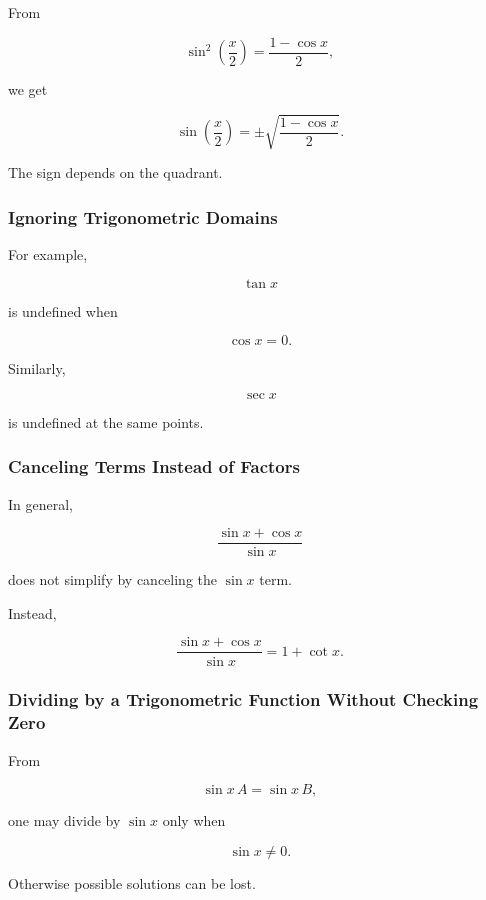 From

\[
\sin^2
\left(
\frac{x}{2}
\right)
=
\frac{1-\cos x}{2},
\]

we get

\[
\boxed{
\sin
\left(
\frac{x}{2}
\right)
=
\pm
\sqrt{
\frac{1-\cos x}{2}
}.
}
\]

The sign depends on the quadrant.

\subsubsection{Ignoring Trigonometric Domains}

For example,

\[
\tan x
\]

is undefined when

\[
\boxed{
\cos x=0.
}
\]

Similarly,

\[
\sec x
\]

is undefined at the same points.

\subsubsection{Canceling Terms Instead of Factors}

In general,

\[
\frac{
\sin x+\cos x
}{
\sin x
}
\]

does not simplify by canceling the \(\sin x\) term.

Instead,

\[
\boxed{
\frac{
\sin x+\cos x
}{
\sin x
}
=
1+\cot x.
}
\]

\subsubsection{Dividing by a Trigonometric Function Without Checking Zero}

From

\[
\sin x\,A
=
\sin x\,B,
\]

one may divide by \(\sin x\) only when

\[
\boxed{
\sin x\neq0.
}
\]

Otherwise possible solutions can be lost.

